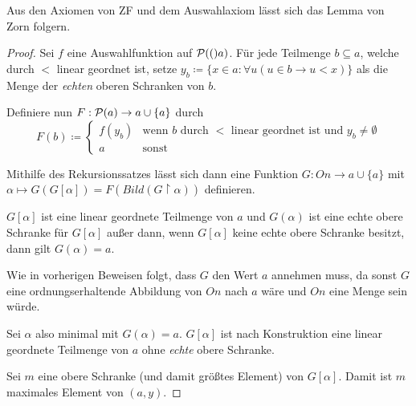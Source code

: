 \begin{satz}
	Aus den Axiomen von ZF und dem Auswahlaxiom lässt sich das Lemma von Zorn folgern.
\end{satz}
\begin{proof}
	Sei $f$ eine Auswahlfunktion auf $\mathcal{P}(()a)$. Für jede Teilmenge $b\subseteq a$, welche durch $<$ linear geordnet ist, setze $y_b\coloneqq\{x\in a:\forall u(u\in b\rightarrow u<x)\}$ als die Menge der \textit{echten} oberen Schranken von $b$.
	
	Definiere nun $F:\mathcal{P}(a)\to a\cup\{a\}$ durch
	$$
	F(b)\coloneqq\begin{cases}
		f(y_b) & \text{wenn } b \text{ durch } < \text{ linear geordnet ist und } y_b\neq\emptyset \\
		a & \text{sonst}
	\end{cases}
	$$
	
	Mithilfe des Rekursionssatzes lässt sich dann eine Funktion $G: On\to a\cup\{a\}$ mit $\alpha\mapsto G(G[\alpha])=F(Bild(G\upharpoonright\alpha))$ definieren.
	
	$G[\alpha]$ ist eine linear geordnete Teilmenge von $a$ und $G(\alpha)$ ist eine echte obere Schranke für $G[\alpha]$ außer dann, wenn $G[\alpha]$ keine echte obere Schranke besitzt, dann gilt $G(\alpha)=a$.
	
	Wie in vorherigen Beweisen folgt, dass $G$ den Wert $a$ annehmen muss, da sonst $G$ eine ordnungserhaltende Abbildung von $On$ nach $a$ wäre und $On$ eine Menge sein würde.
	
	Sei $\alpha$ also minimal mit $G(\alpha)=a$. $G[\alpha]$ ist nach Konstruktion eine linear geordnete Teilmenge von $a$ ohne \textit{echte} obere Schranke.
	
	Sei $m$ eine obere Schranke (und damit größtes Element) von $G[\alpha]$. Damit ist $m$ maximales Element von $(a,y)$.
\end{proof}

